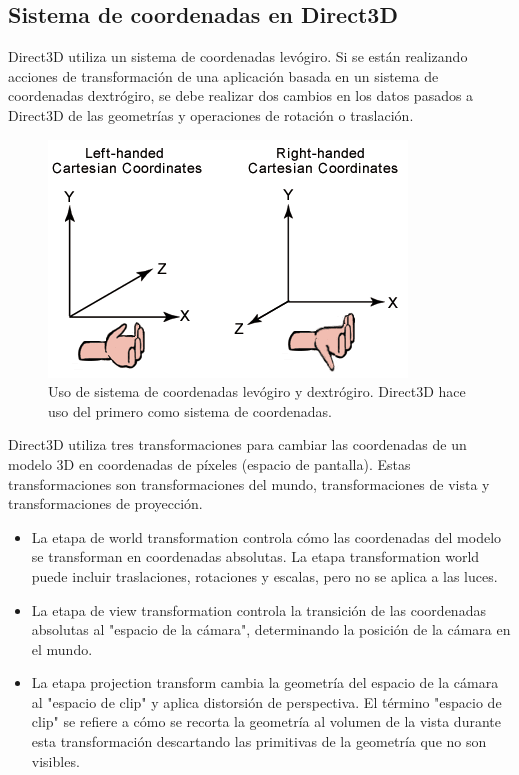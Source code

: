 \documentclass[a4paper, 17pt]{book}
\begin{document}
\subsection{Sistema de coordenadas en Direct3D} 
\label{subsec:SysDirectX}

Direct3D utiliza un sistema de coordenadas levógiro. Si se están realizando acciones de transformación de una aplicación 
basada en un sistema de coordenadas dextrógiro, se debe realizar dos cambios en los datos  pasados ​a Direct3D de las
geometrías y operaciones de rotación o traslación.

\begin{figure}[hbt!]
    \centering
    \includegraphics[scale=0.95, keepaspectratio]{img/leftrght.png}
    \caption{Uso de sistema de coordenadas levógiro y dextrógiro. Direct3D hace uso del primero como sistema de coordenadas.}
    \label{figura:khronos}
\end{figure}

Direct3D utiliza tres transformaciones para cambiar las coordenadas de un modelo 3D en coordenadas de píxeles (espacio de pantalla).
Estas transformaciones son transformaciones del mundo, transformaciones de vista y transformaciones de proyección.

\begin{itemize}
  \item La etapa de world transformation controla cómo las coordenadas del modelo se transforman en coordenadas absolutas.
  La etapa transformation world puede incluir traslaciones, rotaciones y escalas, pero no se aplica a las luces.
  
  \item La etapa de view transformation controla la transición de las coordenadas absolutas al "espacio de la cámara",
  determinando la posición de la cámara en el mundo.

  \item La etapa projection transform cambia la geometría del espacio de la cámara al "espacio de clip" y aplica
  distorsión de perspectiva. El término "espacio de clip" se refiere a cómo se recorta la geometría al volumen
  de la vista durante esta transformación descartando las primitivas de la geometría que no son visibles.
  
\end{itemize}
\end{document}
